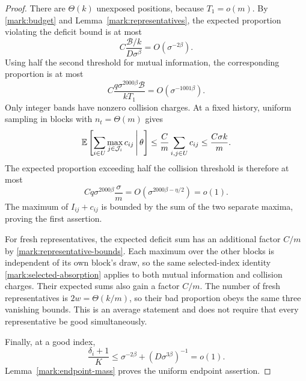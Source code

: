 \begin{proof}
There are $\Theta(k)$ unexposed positions, because $T_1=o(m)$.
By \eqref{mark:budget} and Lemma~\ref{mark:representatives}, the
expected proportion violating the deficit bound is at most
\[
 C\frac{\mathcal B/k}{D\sigma^\beta}=O(\sigma^{-2\beta}).
\]
Using half the second threshold for mutual information, the corresponding
proportion is at most
\[
 C\frac{q\sigma^{2000\beta}\mathcal B}{kT_1}
                  =O(\sigma^{-1001\beta}).
\]
Only integer bands have nonzero collision charges. At a fixed history,
uniform sampling in blocks with $n_t=\Theta(m)$ gives
\[
 \mathbb E\left[\sum_{i\in U}\max_{j\in\mathcal J_i}c_{ij}
                       \,\middle|\,\theta\right]
 \le\frac{C}{m}\sum_{i,j\in U}c_{ij}
 \le\frac{C\sigma k}{m}.
\]
The expected proportion exceeding half the collision threshold is
therefore at most
\[
 Cq\sigma^{2000\beta}\frac{\sigma}{m}
                =O(\sigma^{2000\beta-\eta/2})=o(1).
\]
The maximum of $I_{ij}+c_{ij}$ is bounded by the sum of the two
separate maxima, proving the first assertion.

For fresh representatives, the expected deficit sum has an additional
factor $C/m$ by \eqref{mark:representative-bounds}. Each maximum over
the other blocks is independent of its own block's draw, so the same
selected-index identity \eqref{mark:selected-absorption} applies to
both mutual information and collision charges. Their expected sums
also gain a factor $C/m$. The number of fresh representatives is
$2w=\Theta(k/m)$, so their bad proportion obeys the same three
vanishing bounds. This is an average statement and does not require
that every representative be good simultaneously.

Finally, at a good index,
\[
 \frac{\delta_i+1}{K}
 \le \sigma^{-2\beta}+(D\sigma^{3\beta})^{-1}=o(1).
\]
Lemma~\ref{mark:endpoint-mass} proves the uniform endpoint assertion.
\end{proof}
